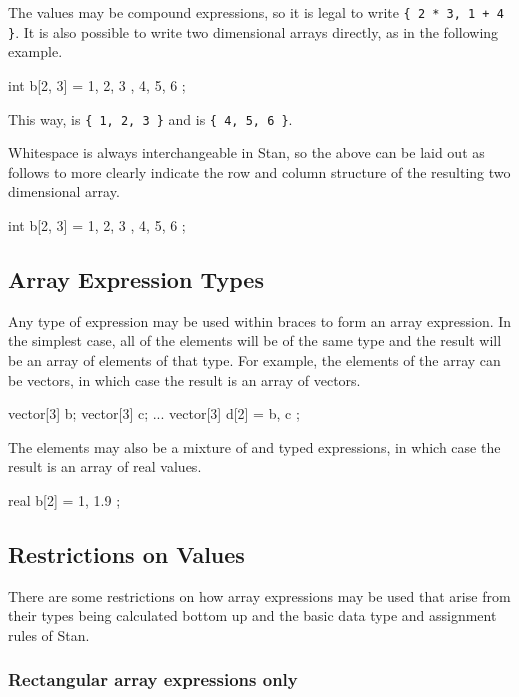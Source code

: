The values may be compound expressions, so it is legal to write
\Verb|{ 2 * 3, 1 + 4 }|. It is also possible to write two dimensional
arrays directly, as in the following example.
%
\begin{stancode}
int b[2, 3] = { { 1, 2, 3 }, { 4, 5, 6 } };
\end{stancode}
%
This way,  is \Verb|{ 1, 2, 3 }| and  is
\Verb|{ 4, 5, 6 }|.

Whitespace is always interchangeable in Stan, so the above can be laid
out as follows to more clearly indicate the row and column structure
of the resulting two dimensional array.
%
\begin{stancode}
int b[2, 3] = { { 1, 2, 3 },
                { 4, 5, 6 } };
\end{stancode}
%

\subsection{Array Expression Types}

Any type of expression may be used within braces to form an array
expression.  In the simplest case, all of the elements will be of the
same type and the result will be an array of elements of that type.
For example, the elements of the array can be vectors, in which case
the result is an array of vectors.
%
\begin{stancode}
vector[3] b;
vector[3] c;
...
vector[3] d[2] = { b, c };
\end{stancode}
%
The elements may also be a mixture of  and  typed
expressions, in which case the result is an array of real values.
%
\begin{stancode}
real b[2] = { 1, 1.9 };
\end{stancode}
%

\subsection{Restrictions on Values}

There are some restrictions on how array expressions may be used that
arise from their types being calculated bottom up and the basic data
type and assignment rules of Stan.

\subsubsection{Rectangular array expressions only}

